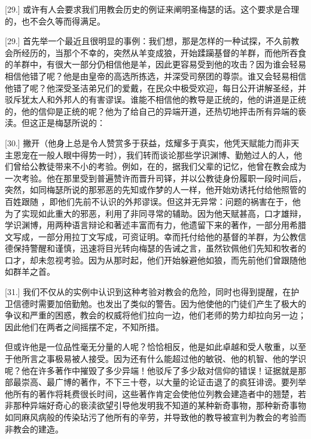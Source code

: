 \par

[29.] 或许有人会要求我们用教会历史的例证来阐明圣梅瑟的话。这个要求是合理的，也不会久等而得满足。\par

[29.] 首先举一个最近且很明显的事例：我们想，那是怎样的一种试探，不久前教会所经历的，当那个不幸的，突然从羊变成狼，开始蹂躏基督的羊群，而他所吞食的羊群中，有很大一部分仍相信他是羊，因此更容易受到他的攻击？因为谁会轻易相信他错了呢？他是由皇帝的高选所拣选，并深受司祭团的尊崇。谁又会轻易相信他错了呢？他深受圣洁弟兄们的爱戴，在民众中极受欢迎，每日公开讲解圣经，并驳斥犹太人和外邦人的有害谬误。谁能不相信他的教导是正统的，他的讲道是正统的，他的信仰是正统的呢？他为了给自己的异端开道，还热切地抨击所有异端的亵渎。但这正是梅瑟所说的： \par

[30.] 撇开（他身上总是令人赞赏多于获益，炫耀多于真实，他凭天赋能力而非天主恩宠在一般人眼中得势一时），我们转而谈论那些学识渊博、勤勉过人的人，他们曾给公教徒带来不小的考验。例如，在的，据我们父辈的记忆，他曾在教会成为一次考验。他在那里受到普遍赞许而晋升司铎，并以公教徒身份履职一段时间后，突然，如同梅瑟所说的那邪恶的先知或作梦的人一样，他开始劝诱托付给他照管的百姓跟随 ，即他们先前不认识的外邦谬误。但这并无异常：问题的祸害在于，他为了实现如此重大的邪恶，利用了非同寻常的辅助。因为他天赋甚高，口才雄辩，学识渊博，用两种语言辩论和著述丰富而有力，他遗留下来的著作，一部分用希腊文写成，一部分用拉丁文写成，可资证明。幸而托付给他的基督的羊群，为公教信德保持警醒和谨慎，迅速将目光转向梅瑟的告诫之言，虽然钦佩他们先知和牧者的口才，却未忽视考验。因为从那时起，他们开始躲避他如狼，而先前他们曾跟随他如群羊之首。\par

[31.] 我们不仅从的实例中认识到这种考验对教会的危险，同时也得到提醒，在护卫信德时需要加倍勤勉。也发出了类似的警告。因为他使他的门徒们产生了极大的争议和严重的困惑，教会的权威将他们拉向一边，他们老师的势力却拉向另一边；因此他们在两者之间摇摆不定，不知所措。\par

但或许他是一位品性毫无分量的人呢？恰恰相反，他是如此卓越和受人敬重，以至于他所言之事极易被人接受。因为还有什么能超过他的敏锐、他的机智、他的学识呢？他在许多著作中摧毁了多少异端！他驳斥了多少敌对信仰的错误！证据就是那部最崇高、最广博的著作，不下三十卷，以大量的论证击退了的疯狂诽谤。要列举他所有的著作将耗费很长时间，这些著作肯定会使他位列教会建造者中的翘楚，若非那种异端好奇心的亵渎欲望引导他发明我不知道的某种新奇事物，那种新奇事物如同麻风病般的传染玷污了他所有的辛劳，并导致他的教导被宣判为教会的考验而非教会的建造。\par

